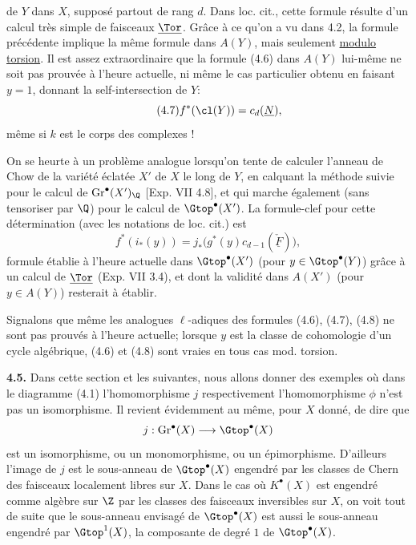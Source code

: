 
de $Y$
dans $X$, supposé partout de rang $d$. Dans loc. cit., cette formule résulte d'un calcul très simple de faisceaux $\underline{\Tor}$. Grâce à ce qu'on a vu dans 4.2, la formule précédente implique la même formule dans $A(Y)$, mais seulement \uline{modulo torsion}. Il est assez extraordinaire que la formule (4.6) dans $A(Y)$ lui-même ne soit pas prouvée à l'heure actuelle, ni même le cas particulier obtenu en faisant $y=1$, donnant la self-intersection de $Y$:
\begin{equation}\tag{4.7}
 f^*(\cl(Y))=c_d(\underline{N}),
\end{equation}
même si $k$ est le corps des complexes !

On se heurte à un problème analogue lorsqu'on tente de calculer l'anneau de Chow de la variété éclatée $X'$ de $X$ le long de $Y$, en calquant la méthode suivie pour le calcul de $\operatorname{Gr}^\bullet(X')_\Q$ [Exp. VII 4.8], et qui marche également (sans tensoriser par $\Q$) pour le calcul de $\Gtop^\bullet(X')$. La formule-clef pour cette détermination (avec les notations de loc. cit.) est
\begin{equation}\tag{4.8}
 f^*(i_*(y))=j_*\bigl(g^*(y)c_{d-1}(\check{\underline F})\bigr),
\end{equation}
formule établie à l'heure actuelle dans $\Gtop^\bullet(X')$ (pour $y\in\Gtop^\bullet(Y)$) grâce à un calcul de $\underline{\Tor}$ (Exp. VII 3.4), et dont la validité dans $A(X')$ (pour $y\in A(Y)$) resterait à établir.

Signalons que même les analogues $\ell$-adiques des formules (4.6), (4.7), (4.8) ne sont pas prouvés à l'heure actuelle; lorsque $y$ est la classe de cohomologie d'un cycle algébrique, (4.6) et (4.8) sont vraies en tous cas mod. torsion.

\textbf{4.5.} Dans cette section et les suivantes, nous allons donner des exemples où dans le diagramme (4.1) l'homomorphisme $j$ respectivement l'homomorphisme $\phi$ n'est pas un isomorphisme. Il revient évidemment au même, pour $X$ donné, de dire que
\[
 j:\operatorname{Gr}^\bullet(X)\longrightarrow \Gtop^\bullet(X)
\]
est un isomorphisme, ou un monomorphisme, ou un épimorphisme. D'ailleurs l'image de $j$ est le sous-anneau de $\Gtop^\bullet(X)$ engendré par les classes de Chern des faisceaux localement libres sur $X$. Dans le cas où $K^\bullet(X)$ est engendré comme algèbre sur $\Z$ par les classes des faisceaux inversibles sur $X$, on voit tout de suite que le sous-anneau envisagé de $\Gtop^\bullet(X)$ est aussi le sous-anneau engendré par $\Gtop^1(X)$, la composante de degré $1$ de $\Gtop^\bullet(X)$.
